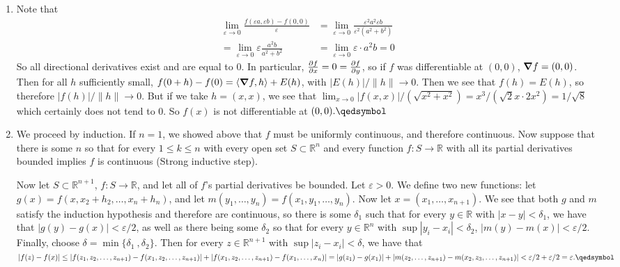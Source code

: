 \documentclass[12pt]{article}
\theoremstyle{definition}
\theoremstyle{remark}
\newcommand{\R}{\mathbb{R}}
\renewcommand{\ip}[2]{\langle #1, #2 \rangle}
\newcommand{\mg}[1]{\| #1 \|}
\newcommand{\ve}{\varepsilon}
\renewcommand{\qed}{\hfill\qedsymbol}
\begin{document}
\begin{enumerate}[leftmargin=\labelsep]
		\item 
		Note that 
		\begin{align*}
			\lim_{\ve \to 0} \frac{f(\ve a, \ve b) - f(0, 0)}{\ve} &= \lim_{\ve \to 0} \frac{\ve^2 a^2 \ve b}{\ve^2(a^2+b^2)}
			\\= \lim_{\ve \to 0} \ve \frac{a^2b}{a^2+b^2} &= \lim_{\ve \to 0} \ve \cdot a^2b = 0
		\end{align*}
		So all directional derivatives exist and are equal to $0$. In particular, $\pdv{f}{x}=0=\pdv{f}{y}$, so if $f$ was differentiable at $(0, 0)$, $\grad{f} = (0, 0)$. Then for all $h$ sufficiently small, $f(0+h)-f(0)=\ip{\grad{f}} {h}+E(h)$, with $|E(h)|/\mg{h} \to 0$. Then we see that $f(h) = E(h)$, so therefore $|f(h)|/\mg{h} \to 0$. But if we take $h = (x, x)$, we see that $\lim_{x \to 0} |f(x, x)|/(\sqrt{x^2+x^2})=x^3/(\sqrt{2}x \cdot 2x^2)=1/\sqrt{8}$ which certainly does not tend to 0. So $f(x)$ is not differentiable at $(0, 0). \qed$
		
		\item 
		We proceed by induction. If $n=1$, we showed above that $f$ must be uniformly continuous, and therefore continuous.
		Now suppose that there is some $n$ so that for every $1 \leq k \leq n$ with every open set $S \subset \R^n$ and every function $f:S\to \R$ with all its partial derivatives bounded implies $f$ is continuous (Strong inductive step).
		
		Now let $S \subset \R^{n+1}$, $f:S \to \R$, and let all of $f$'s partial derivatives be bounded. Let $\ve > 0$. We define two new functions: let $g(x)= f(x, x_2+h_2, \ldots, x_n+h_n)$, and let $m(y_1, \ldots, y_n)=f(x_1, y_1, \ldots, y_n)$. Now let $x = (x_1, \ldots, x_{n+1})$. We see that both $g$ and $m$ satisfy the induction hypothesis and therefore are continuous, so there is some $\delta_1$ such that for every $y \in \R$ with $|x-y| < \delta_1$, we have that $|g(y)-g(x)| < \ve/2$, as well as there being some $\delta_2$ so that for every $y \in \R^n$ with $\sup{|y_i-x_i|} < \delta_2$, $|m(y)-m(x)| < \ve/2$. Finally, choose $\delta = \min\{\delta_1\ ,\delta_2\}$. Then for every $z \in \R^{n+1}$ with $\sup{|z_i-x_i|} < \delta$, we have that $|f(z)-f(x)| \leq |f(z_1, z_2, \ldots, z_{n+1})-f(x_1, z_2, \ldots, z_{n+1})|+|f(x_1, z_2, \ldots, z_{n+1})-f(x_1, \ldots, x_n)| = |g(z_1)-g(x_1)| + |m(z_2, \ldots, z_{n+1}) - m(x_2, z_3, \ldots, z_{n+1})| < \ve/2 + \ve/2 = \ve. \qed$
		\end{enumerate}
\end{document}
